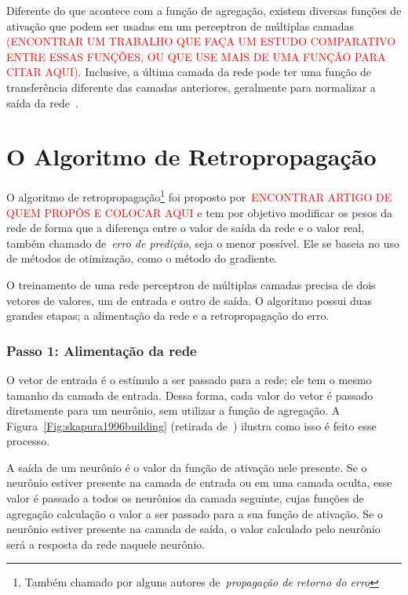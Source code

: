 Diferente do que acontece com a função de agregação, existem diversas funções de ativação que podem ser usadas em um perceptron de múltiplas camadas \textcolor{red}{(ENCONTRAR UM TRABALHO QUE FAÇA UM ESTUDO COMPARATIVO ENTRE ESSAS FUNÇÕES, OU QUE USE MAIS DE UMA FUNÇÃO PARA CITAR AQUI)}. Inclusive, a última camada da rede pode ter uma função de transferência diferente das camadas anteriores, geralmente para normalizar a saída da rede~\cite{ARTIGO:2014.7078569}.

\section{O Algoritmo de Retropropagação}

O algoritmo de retropropagação\footnote{Também chamado por alguns autores de~\emph{propagação de retorno do erro}} foi proposto por~\textcolor{red}{ENCONTRAR ARTIGO DE QUEM PROPÔS E COLOCAR AQUI} e tem por objetivo modificar os pesos da rede de forma que a diferença entre o valor de saída da rede e o valor real, também chamado de~\emph{erro de predição}, seja o menor possível. Ele se baseia no uso de métodos de otimização, como o método do gradiente.

O treinamento de uma rede perceptron de múltiplas camadas precisa de dois vetores de valores, um de entrada e outro de saída. O algoritmo possui duas grandes etapas; a alimentação da rede e a retropropagação  do erro.

\subsubsection{Passo 1: Alimentação da rede}

O vetor de entrada é o estímulo a ser passado para a rede; ele tem o mesmo tamanho da camada de entrada. Dessa forma, cada valor do vetor é passado diretamente para um neurônio, sem utilizar a função de agregação. A Figura~\ref{Fig:skapura1996building} (retirada de~\cite{LIVRO:1996.skapura1996building}) ilustra como isso é feito esse processo.

A saída de um neurônio é o valor da função de ativação nele presente. Se o neurônio estiver presente na camada de entrada ou em uma camada oculta, esse valor é passado a todos os neurônios da camada seguinte, cujas funções de agregação calculação o valor a ser passado para a sua função de ativação. Se o neurônio estiver presente na camada de saída, o valor calculado pelo neurônio será a resposta da rede naquele neurônio.

